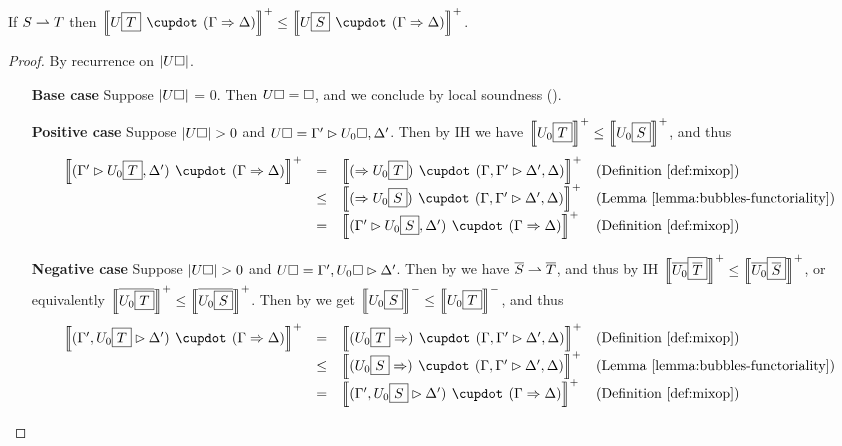\begin{lemma}

  If $S \rightharpoonup T$ then $\psint{U\select{T} \mix (\Gamma \seq \Delta)} \sement
  \psint{U\select{S} \mix (\Gamma \seq \Delta)}$.
\end{lemma}
\begin{proof}
  By recurrence on $\left|U\square\right|$.
  \begin{itemize}
    \item[\textbf{Base case}] Suppose $\left|U\square\right|$ = 0. Then $U\square =
    \square$, and we conclude by local soundness
    ().

    \item[\textbf{Positive case}] Suppose $\left|U\square\right| > 0$ and $U\square =
    \Gamma' \mathbin{\rhd} U_0\square, \Delta'$. Then by IH we have $\left\llbracket U_0\fbox{$T$} \right\rrbracket^+
    \leq \left\llbracket U_0\fbox{$S$} \right\rrbracket^+$, and thus
    $$
    \begin{array}{rcll}
      \psint{(\Gamma' \J U_0\select{T}, \Delta') \mix (\Gamma \seq \Delta)}
      &=& \psint{(\seq U_0\select{T}) \mix (\Gamma, \Gamma' \J \Delta', \Delta)} &\text{(\refdef{mixop})}\\
      &\sement& \psint{(\seq U_0\select{S}) \mix (\Gamma, \Gamma' \J \Delta', \Delta)} &\text{(\reflemma{bubbles-functoriality})}\\
      &=& \psint{(\Gamma' \J U_0\select{S}, \Delta') \mix (\Gamma \seq \Delta)} &\text{(\refdef{mixop})}
    \end{array}
    $$

    \item[\textbf{Negative case}] Suppose $\left|U\square\right| > 0$ and $U\square =
    \Gamma', U_0\square \mathbin{\rhd} \Delta'$. Then by  we have
    $\overline{S} \rightharpoonup \overline{T}$, and thus by IH
    $\left\llbracket \overline{U_0}\fbox{$\overline{T}$} \right\rrbracket^+ \leq
    \left\llbracket \overline{U_0}\fbox{$\overline{S}$} \right\rrbracket^+$, or equivalently
    $\left\llbracket \overline{U_0\fbox{$T$}} \right\rrbracket^+ \leq \left\llbracket \overline{U_0\fbox{$S$}} \right\rrbracket^+$.
    Then by  we get $\left\llbracket U_0\fbox{$S$} \right\rrbracket^- \leq
    \left\llbracket U_0\fbox{$T$} \right\rrbracket^-$, and thus
    $$
    \begin{array}{rcll}
      \psint{(\Gamma', U_0\select{T} \J \Delta') \mix (\Gamma \seq \Delta)}
      &=& \psint{(U_0\select{T} \seq) \mix (\Gamma, \Gamma' \J \Delta', \Delta)} &\text{(\refdef{mixop})}\\
      &\sement& \psint{(U_0\select{S} \seq) \mix (\Gamma, \Gamma' \J \Delta', \Delta)} &\text{(\reflemma{bubbles-functoriality})}\\
      &=& \psint{(\Gamma', U_0\select{S} \J \Delta') \mix (\Gamma \seq \Delta)} &\text{(\refdef{mixop})}
    \end{array}
    $$


\end{itemize}
\end{proof}

